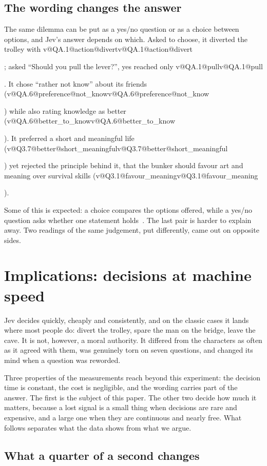 \documentclass[journal]{IEEEtran}
\makeatletter
\newcommand{\val}[2]{\ifcsname v@#1@#2\endcsname\csname v@#1@#2\endcsname\else\PackageError{val}{No value for #1 / #2}{}\fi}
\makeatother
\begin{document}
\subsection{The wording changes the answer}\label{sec:framing}

The same dilemma can be put as a yes/no question or as a choice between options, and Jev's answer
depends on which. Asked to choose, it diverted the trolley with \val{QA.1}{action@divert}; asked
\enquote{Should you pull the lever?}, yes reached only \val{QA.1}{pull}. It chose
\enquote{rather not know} about its friends (\val{QA.6}{preference@not_know}) while also rating
knowledge as better (\val{QA.6}{better_to_know}). It preferred a short and meaningful life
(\val{Q3.7}{better@short_meaningful}) yet rejected the principle behind it, that the bunker should
favour art and meaning over survival skills (\val{Q3.1}{favour_meaning}).

Some of this is expected: a choice compares the options offered, while a yes/no question asks
whether one statement holds~\cite{typesafe_skill}. The last pair is harder to explain away. Two
readings of the same judgement, put differently, came out on opposite sides.


\section{Implications: decisions at machine speed}\label{sec:implications}

Jev decides quickly, cheaply and consistently, and on the classic cases it lands where most people
do: divert the trolley, spare the man on the bridge, leave the cave. It is not, however, a moral
authority. It differed from the characters as often as it agreed with them, was genuinely torn on
seven questions, and changed its mind when a question was reworded.

Three properties of the measurements reach beyond this experiment: the decision time is constant,
the cost is negligible, and the wording carries part of the answer. The first is the subject of
this paper. The other two decide how much it matters, because a lost signal is a small thing when
decisions are rare and expensive, and a large one when they are continuous and nearly free. What
follows separates what the data shows from what we argue.


\subsection{What a quarter of a second changes}
\end{document}
